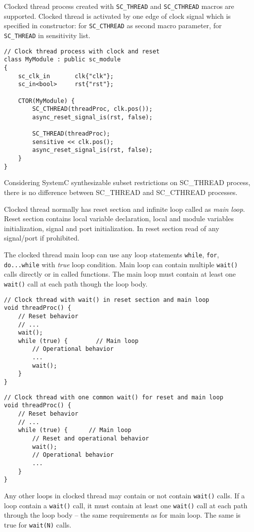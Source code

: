 Clocked thread process created with {\tt SC\_THREAD} and {\tt SC\_CTHREAD} macros are supported.  
Clocked thread is activated by one edge of clock signal which is specified in constructor: for {\tt SC\_CTHREAD} as second macro parameter, for {\tt SC\_THREAD} in sensitivity list. 
%
\begin{lstlisting}[style=mycpp]
// Clock thread process with clock and reset
class MyModule : public sc_module 
{
    sc_clk_in       clk{"clk"};
    sc_in<bool>     rst{"rst"};
    
	CTOR(MyModule) {
        SC_CTHREAD(threadProc, clk.pos());
        async_reset_signal_is(rst, false);
        
        SC_THREAD(threadProc);
        sensitive << clk.pos();
        async_reset_signal_is(rst, false);
	}     
}
\end{lstlisting}
%
Considering SystemC synthesizable subset restrictions on SC\_THREAD process, there is no difference between SC\_THREAD and SC\_CTHREAD processes.

Clocked thread normally has reset section and infinite loop called as \emph{main loop}. Reset section contains local variable declaration, local and module variables initialization, signal and port initialization. In reset section read of any signal/port if prohibited.

The clocked thread main loop can use any loop statements {\tt while}, {\tt for}, {\tt do...while} with \emph{true} loop condition. Main loop can contain multiple {\tt wait()} calls directly or in called functions. The main loop must contain at least one {\tt wait()} call at each path though the loop body. 
%
\begin{lstlisting}[style=mycpp]
// Clock thread with wait() in reset section and main loop
void threadProc() {
    // Reset behavior
    // ...
    wait();
    while (true) {        // Main loop
        // Operational behavior
        ...
        wait();
    }
}
\end{lstlisting}

\begin{lstlisting}[style=mycpp]
// Clock thread with one common wait() for reset and main loop
void threadProc() {
    // Reset behavior
    // ...
    while (true) {      // Main loop
        // Reset and operational behavior
        wait();
        // Operational behavior
        ...
    }
}
\end{lstlisting}

Any other loops in clocked thread may contain or not contain {\tt wait()} calls. If a loop contain a {\tt wait()} call, it must contain at least one {\tt wait()} call at each path through the loop body -- the same requirements as for main loop.
The same is true for {\tt wait(N)} calls.


